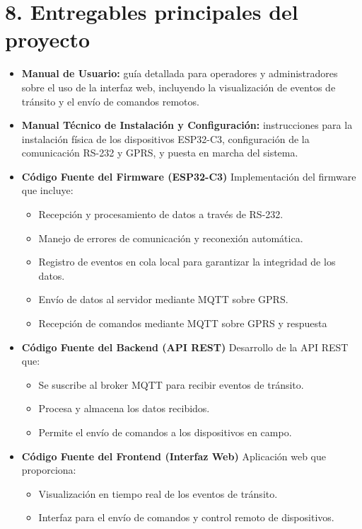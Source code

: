 \documentclass[
11pt, %
]{charter}
\begin{document}
\section{8. Entregables principales del proyecto}
\label{sec:entregables}

\begin{itemize}
	\item \textbf{Manual de Usuario:} guía detallada para operadores y administradores sobre el uso de la interfaz web, incluyendo la visualización de eventos de tránsito y el envío de comandos remotos.
	\item \textbf{Manual Técnico de Instalación y Configuración:} instrucciones para la instalación física de los dispositivos ESP32-C3, configuración de la comunicación RS-232 y GPRS, y puesta en marcha del sistema.
	\item \textbf{Código Fuente del Firmware (ESP32-C3)}
	Implementación del firmware que incluye:
	\begin{itemize}
	\item Recepción y procesamiento de datos a través de RS-232.
	\item Manejo de errores de comunicación y reconexión automática.
	\item Registro de eventos en cola local para garantizar la integridad de los datos.
	\item Envío de datos al servidor mediante MQTT sobre GPRS.
	\item Recepción de comandos mediante MQTT sobre GPRS y respuesta
	\end{itemize}

\item \textbf{Código Fuente del Backend (API REST)}
Desarrollo de la API REST que:

\begin{itemize}
\item Se suscribe al broker MQTT para recibir eventos de tránsito.
\item Procesa y almacena los datos recibidos.
\item Permite el envío de comandos a los dispositivos en campo. 
\end{itemize}

\item \textbf{Código Fuente del Frontend (Interfaz Web)}
Aplicación web que proporciona:
\begin{itemize}
\item Visualización en tiempo real de los eventos de tránsito.
\item Interfaz para el envío de comandos y control remoto de dispositivos.
\end{itemize}


\end{itemize}
\end{document}
